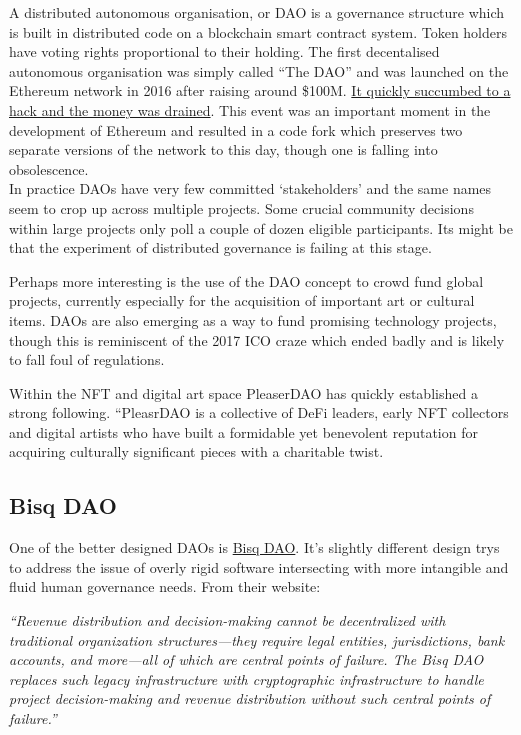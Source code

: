 A distributed autonomous organisation, or DAO is a governance structure which is built in distributed code on a blockchain smart contract system. Token holders have voting rights proportional to their holding. The first decentalised autonomous organisation was simply called ``The DAO'' and was launched on the Ethereum network in 2016 after raising around \$100M. \href{https://www.gemini.com/cryptopedia/the-dao-hack-makerdao#section-what-is-a-dao}{It quickly succumbed to a hack and the money was drained}. This event was an important moment in the development of Ethereum and resulted in a code fork which preserves two separate versions of the network to this day, though one is falling into obsolescence. \\
In practice DAOs have very few committed `stakeholders' and the same names seem to crop up across multiple projects. Some crucial community decisions within large projects only poll a couple of dozen eligible participants. Its might be that the experiment of distributed governance is failing at this stage. \par
Perhaps more interesting is the use of the DAO concept to crowd fund global projects, currently especially for the acquisition of important art or cultural items. DAOs are also emerging as a way to fund promising technology projects, though this is reminiscent of the 2017 ICO craze which ended badly and is likely to fall foul of regulations.\par
Within the NFT and digital art space  PleaserDAO has quickly established a strong following.
``PleasrDAO is a collective of DeFi leaders, early NFT collectors and digital artists who have built a formidable yet benevolent reputation for acquiring culturally significant pieces with a charitable twist.\par

\subsection{Bisq DAO}
One of the better designed DAOs is \href{https://bisq.network/dao/}{Bisq DAO}. It's slightly different design trys to address the issue of overly rigid software intersecting with more intangible and fluid human governance needs. From their website:\par
\textit{``Revenue distribution and decision-making cannot be decentralized with traditional organization structures—they require legal entities, jurisdictions, bank accounts, and more—all of which are central points of failure.
The Bisq DAO replaces such legacy infrastructure with cryptographic infrastructure to handle project decision-making and revenue distribution without such central points of failure.''}

